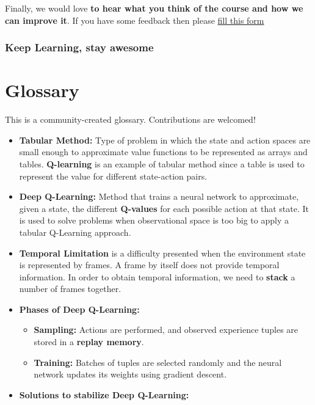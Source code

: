 \documentclass[11pt,a4paper]{article}
\begin{document}
Finally, we would love \textbf{to hear what you think of the course and how we can improve it}. If you have some feedback then please \href{https://forms.gle/BzKXWzLAGZESGNaE9}{fill this form}

\subsubsection{Keep Learning, stay awesome}\label{keep-learning-stay-awesome-1}

\section{Glossary}\label{glossary}

This is a community-created glossary. Contributions are welcomed!

\begin{itemize}
\item
  \textbf{Tabular Method:} Type of problem in which the state and action spaces are small enough to approximate value functions to be represented as arrays and tables. \textbf{Q-learning} is an example of tabular method since a table is used to represent the value for different state-action pairs.
\item
  \textbf{Deep Q-Learning:} Method that trains a neural network to approximate, given a state, the different \textbf{Q-values} for each possible action at that state. It is used to solve problems when observational space is too big to apply a tabular Q-Learning approach.
\item
  \textbf{Temporal Limitation} is a difficulty presented when the environment state is represented by frames. A frame by itself does not provide temporal information. In order to obtain temporal information, we need to \textbf{stack} a number of frames together.
\item
  \textbf{Phases of Deep Q-Learning:}

  \begin{itemize}
  \tightlist
  \item
    \textbf{Sampling:} Actions are performed, and observed experience tuples are stored in a \textbf{replay memory}.
  \item
    \textbf{Training:} Batches of tuples are selected randomly and the neural network updates its weights using gradient descent.
  \end{itemize}
\item
  \textbf{Solutions to stabilize Deep Q-Learning:}


\end{itemize}
\end{document}
